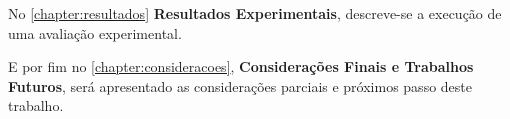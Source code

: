 \par

No \autoref{chapter:resultados} \textbf{Resultados Experimentais}, descreve-se a execução de uma avaliação experimental.
\par
E por fim no \autoref{chapter:consideracoes}, \textbf{Considerações Finais e Trabalhos Futuros}, será apresentado as
considerações parciais e próximos passo deste trabalho.


